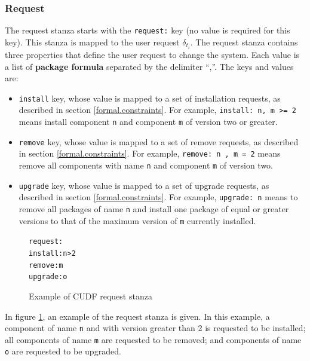 \subsubsection{Request}
\label{formal.cudfdes.request}
The request stanza starts with the \verb+request:+ key (no value is required for this key).
This stanza is mapped to the user request $\delta_{t_i}$.
The request stanza contains three properties that define the user request to change the system.
Each value is a list of \textbf{package formula} separated by the delimiter ``,''.
The keys and values are:
\begin{itemize}
  \item \verb+install+ key, whose value is mapped to a set of installation requests, as described in section \ref{formal.constraints}.
  For example, \verb+install: n, m >= 2+ means install component \verb+n+ and component \verb+m+ of version two or greater.
  \item \verb+remove+ key, whose value is mapped to a set of remove requests, as described in section \ref{formal.constraints}.
  For example, \verb+remove: n , m = 2+ means remove all components with name \verb+n+ and component \verb+m+ of version two.
  \item \verb+upgrade+ key, whose value is mapped to a set of upgrade requests, as described in section \ref{formal.constraints}.
  For example, \verb+upgrade: n+ means to remove all packages of name \verb+n+ and install one package of equal or greater versions to that of the maximum version of \verb+m+ currently installed. 
\end{itemize}

\begin{figure}[htp] 
\begin{center}
\begin{alltt}
request:
install: n > 2
remove: m
upgrade: o
\end{alltt}
  \caption{Example of CUDF request stanza}
  \label{formal.cudfrequeststanza}
\end{center}
\end{figure}

In figure \ref{formal.cudfrequeststanza}, an example of the request stanza is given.
In this example, a component of name \verb+n+ and with version greater than 2 is requested to be installed; all components of name \verb+m+ are requested to be removed;
and components of name \verb+o+ are requested to be upgraded.

